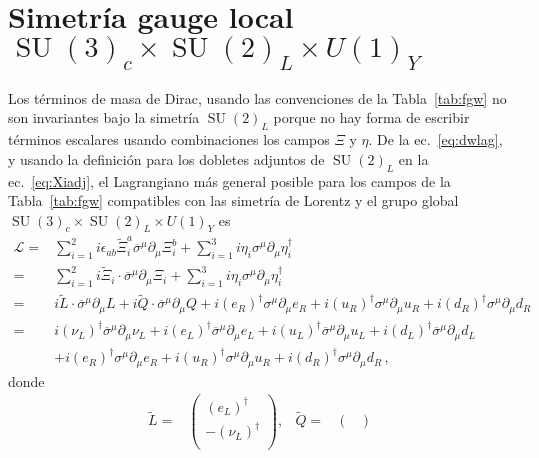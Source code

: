 \section{Simetría gauge local $\operatorname{SU}(3)_c\times  \operatorname{SU}(2)_L\times  U(1)_Y$}
\begin{frame}
Los términos de masa de Dirac, usando las convenciones de la
Tabla~\ref{tab:fgw} no son invariantes bajo la simetría $\operatorname{SU}(2)_L$ porque
no hay forma de escribir términos escalares usando combinaciones los
campos $\Xi$ y $\eta$.  De la ec.~\eqref{eq:dwlag}, y usando la definición para los dobletes adjuntos de $\operatorname{SU}(2)_L$ en la ec.~\eqref{eq:Xiadj}, el Lagrangiano más
general posible para los campos de la Tabla~\ref{tab:fgw} compatibles
con las simetría de Lorentz y el grupo global $\operatorname{SU}(3)_c\times
\operatorname{SU}(2)_L\times U(1)_Y$ es
\begin{align}
  \mathcal{L}=&\sum_{i=1}^2i\epsilon_{ab}\widetilde{\Xi}_i^{a}\overline{\sigma}^{\mu}\partial_{\mu}\Xi_i^{b}
+\sum_{i=1}^3i\eta_{i}\sigma^{\mu}\partial_{\mu} \eta^{\dagger}_i\nonumber\\
  =&\sum_{i=1}^2i\widetilde{\Xi}_i\cdot\overline{\sigma}^{\mu}\partial_{\mu}\Xi_i
+\sum_{i=1}^3i\eta_{i}\sigma^{\mu}\partial_{\mu} \eta^{\dagger}_i\nonumber\\
=&i\widetilde{L}\cdot\overline{\sigma}^{\mu}\partial_{\mu}L+i\widetilde{Q}\cdot\overline{\sigma}^{\mu}\partial_{\mu}Q
+i(e_R)^{\dagger}\sigma^{\mu}\partial_{\mu} e_R+i(u_R)^{\dagger}\sigma^{\mu}\partial_{\mu} u_R+i
(d_R)^{\dagger}\sigma^{\mu}\partial_{\mu} d_R \nonumber\\
=&i(\nu_L)^{\dagger}\overline{\sigma}^{\mu}\partial_{\mu}\nu_L+i(e_L)^{\dagger}\overline{\sigma}^{\mu}\partial_{\mu}e_L
+i (u_L)^{\dagger}\overline{\sigma}^{\mu}\partial_{\mu}u_L+i(d_L)^{\dagger}\overline{\sigma}^{\mu}\partial_{\mu}d_L \nonumber\\
&+i(e_R)^{\dagger}\sigma^{\mu}\partial_{\mu}e_R+i(u_R)^{\dagger}\sigma^{\mu}\partial_{\mu} u_R+i(d_R)^{\dagger}\sigma^{\mu}\partial_{\mu} d_R \,,
\end{align}
donde
\begin{align}
\label{eq:widetildeLQ}
  \widetilde{L}=&
  \begin{pmatrix}
   \left(e_L\right)^{\dagger}\\
  - \left(\nu_L  \right)^{\dagger}\\
  \end{pmatrix},&
  \widetilde{Q}=&
  \begin{pmatrix}

\end{pmatrix}
\end{align}
\end{frame}
